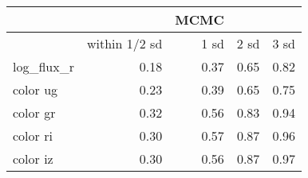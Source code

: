 \begin{tabular}{lrrrr}
{} &  &  \textbf{MCMC} &  & \\
\toprule
{} & within 1/2 sd & 1 sd & 2 sd & 3 sd \\
\midrule
log\_flux\_r &          0.18 & 0.37 & 0.65 & 0.82 \\
color ug   &          0.23 & 0.39 & 0.65 & 0.75 \\
color gr   &          0.32 & 0.56 & 0.83 & 0.94 \\
color ri   &          0.30 & 0.57 & 0.87 & 0.96 \\
color iz   &          0.30 & 0.56 & 0.87 & 0.97 \\
\bottomrule
\end{tabular}
